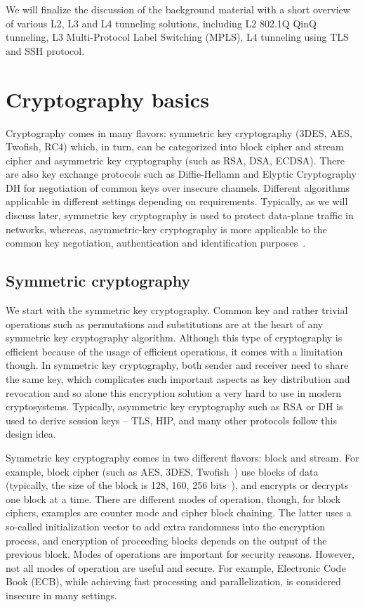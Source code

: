 We will finalize the discussion of the background material with a short overview of 
various L2, L3 and L4 tunneling solutions, including L2 802.1Q QinQ tunneling, 
L3 Multi-Protocol Label Switching (MPLS), L4 tunneling using TLS and SSH protocol.

\section{Cryptography basics}

Cryptography comes in many flavors: symmetric key cryptography 
(3DES, AES, Twofish, RC4) which, in turn, can be categorized into 
block cipher and stream cipher and asymmetric key cryptography 
(such as RSA, DSA, ECDSA). There are also key exchange protocols 
such as Diffie-Hellamn and Elyptic Cryptography DH for negotiation 
of common keys over insecure channels. Different algorithms applicable 
in different settings depending on requirements. Typically, as we will 
discuss later, symmetric key cryptography is used to protect 
data-plane traffic in networks, whereas, asymmetric-key cryptography is 
more applicable to the common key negotiation, authentication and 
identification purposes~\cite{Stinson:Cryptography}.

\subsection{Symmetric cryptography}

We start with the symmetric key cryptography. Common key and rather 
trivial operations such as permutations and substitutions are at the 
heart of any symmetric key cryptography algorithm. Although this type 
of cryptography is efficient because of the usage of efficient operations, 
it comes with a limitation though. In symmetric key cryptography, 
both sender and receiver need to share the same key, which complicates 
such important aspects as key distribution and revocation and so alone 
this encryption solution a very hard to use in modern cryptosystems. 
Typically, asymmetric key cryptography such as RSA or DH is used to derive session 
keys – TLS, HIP, and many other protocols follow this design idea.

Symmetric key cryptography comes in two different flavors: block and stream. 
For example, block cipher (such as AES, 3DES, Twofish~\cite{Stinson:Cryptography}) 
use blocks of data (typically, the size of the block is 128, 160, 256 
bits~\cite{Stinson:Cryptography}), and encrypts or 
decrypts one block at a time. There are different modes of operation, though, 
for block ciphers, examples are counter mode and cipher block chaining. 
The latter uses a so-called initialization vector to add extra randomness into the encryption 
process, and encryption of proceeding blocks depends on the output of the previous 
block. Modes of operations are important for security reasons. However, not all 
modes of operation are useful and secure. For example, Electronic Code Book (ECB), 
while achieving fast processing and parallelization, is considered insecure in 
many settings.

